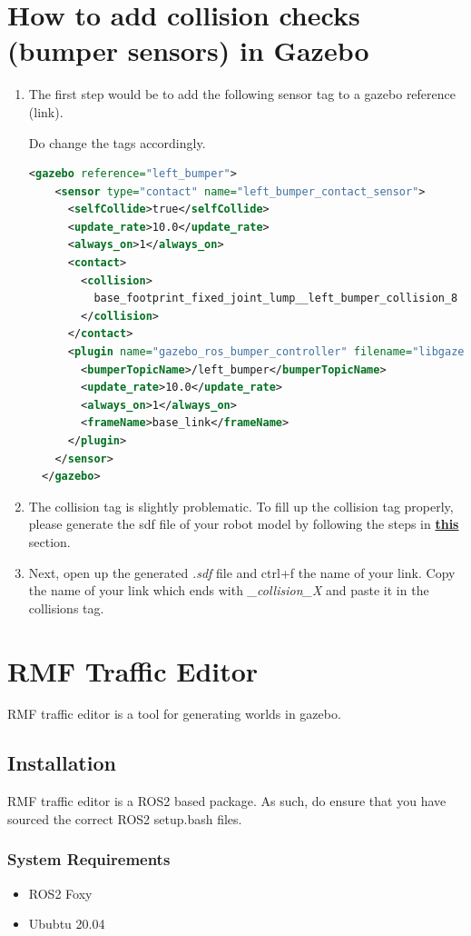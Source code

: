 \documentclass[11pt]{article}
\begin{document}
\section{How to add collision checks (bumper sensors) in Gazebo}
\begin{enumerate}
 \item {
       The first step would be to add the following sensor tag to a gazebo reference (link).

       Do change the tags accordingly.
       \begin{lstlisting}[language=xml]
  <gazebo reference="left_bumper">
    <sensor type="contact" name="left_bumper_contact_sensor">
      <selfCollide>true</selfCollide>
      <update_rate>10.0</update_rate>
      <always_on>1</always_on>
      <contact>
        <collision>
          base_footprint_fixed_joint_lump__left_bumper_collision_8
        </collision>
      </contact>
      <plugin name="gazebo_ros_bumper_controller" filename="libgazebo_ros_bumper.so">
        <bumperTopicName>/left_bumper</bumperTopicName>
        <update_rate>10.0</update_rate>
        <always_on>1</always_on>
        <frameName>base_link</frameName>
      </plugin>
    </sensor>
  </gazebo>
\end{lstlisting}
       }
 \item {
       The collision tag is slightly problematic. To fill up the collision tag properly, please generate the
       sdf file of your robot model by following the steps in \hyperref[sec:conversion]{\textbf{this}} section.
       }
 \item {
       Next, open up the generated \emph{.sdf} file and ctrl+f the name of your link. Copy the name of your link which ends with \emph{\_collision\_X} and paste it in the collisions tag.

       }
\end{enumerate}
\section{RMF Traffic Editor}
RMF traffic editor is a tool for generating worlds in gazebo.
\subsection{Installation}
RMF traffic editor is a ROS2 based package. As such, do ensure that you have sourced the correct ROS2 setup.bash files.
\subsubsection{System Requirements}
\begin{itemize}
 \item {ROS2 Foxy}
 \item {Ububtu 20.04}
\end{itemize}
\end{document}
